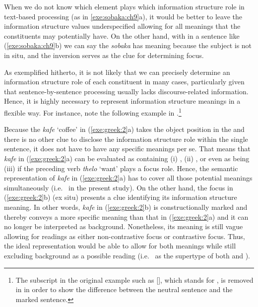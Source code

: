 \noindent When we do not know which element plays which information
structure role in text-based processing (as in \ref{exe:sobaka:ch9}a),
it would be better to leave the information structure values
underspecified allowing for all meanings that the constituents may
potentially have. On the other hand, with in a sentence like
(\ref{exe:sobaka:ch9}b) we can say the \textit{sobaka} has 
meaning because the subject is not in situ, and the inversion
serves as the clue for determining focus.


As exemplified hitherto, it is not likely that we can precisely
determine an information structure role of each constituent in many
cases, particularly given that sentence-by-sentence processing usually
lacks discourse-related information.  Hence, it is highly necessary to
represent information structure meanings in a flexible way.  For
instance, note the following example in .\footnote{The
  subscript in the original example such as [], which
  stands for , is removed in
   in order to show the difference between the
  neutral sentence and the marked sentence.}




\noindent Because the   \textit{kafe} `coffee' in
(\ref{exe:greek:2}a) takes the object position in the  and there is no other clue to disclose the information
structure role within the single sentence, it does not have to have
any specific meanings per se. That means that \textit{kafe}
in (\ref{exe:greek:2}a) can be evaluated as containing (i)
, (ii) , or even as being (iii)
 if the preceding verb \textit{thelo} `want' plays a
focus role. Hence, the semantic representation of \textit{kafe} in
(\ref{exe:greek:2}a) has to cover all those potential meanings
simultaneously (i.e.\  in the present study).  On the
other hand, the  focus in (\ref{exe:greek:2}b)
(ex situ) presents a clue identifying its information
structure meaning.  In other words, \textit{kafe} in
(\ref{exe:greek:2}b) is constructionally marked and thereby conveys a
more specific meaning than that in (\ref{exe:greek:2}a) and it can no
longer be interpreted as background. Nonetheless, its meaning is still
vague allowing for readings as either non-contrastive focus or
contrastive focus. Thus, the ideal representation would be able to
allow for both meanings while still excluding background as a possible
reading (i.e.\  as the supertype of both
 and ).


